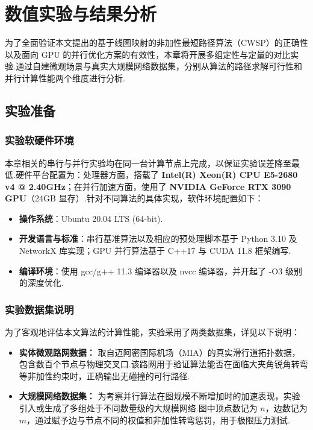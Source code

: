 
\chapter{数值实验与结果分析}

为了全面验证本文提出的基于线图映射的非加性最短路径算法（CWSP）的正确性以及面向 GPU 的并行优化方案的有效性，本章将开展多组定性与定量的对比实验.通过自建微观场景与真实大规模网络数据集，分别从算法的路径求解可行性和并行计算性能两个维度进行分析.

\section{实验准备}

\subsection{实验软硬件环境}
本章相关的串行与并行实验均在同一台计算节点上完成，以保证实验误差降至最低.硬件平台配置为：处理器方面，搭载了 \textbf{Intel(R) Xeon(R) CPU E5-2680 v4 @ 2.40GHz}；在并行加速方面，使用了 \textbf{NVIDIA GeForce RTX 3090 GPU}（24GB 显存）.针对不同算法的具体实现，软件环境配置如下：
\begin{itemize}
    \item \textbf{操作系统}：Ubuntu 20.04 LTS (64-bit).
    \item \textbf{开发语言与标准}：串行基准算法以及相应的预处理脚本基于 Python 3.10 及 NetworkX 库实现；GPU 并行算法基于 C++17 与 CUDA 11.8 框架编写.
    \item \textbf{编译环境}：使用 gcc/g++ 11.3 编译器以及 nvcc 编译器，并开起了 -O3 级别的深度优化.
\end{itemize}

\subsection{实验数据集说明}
为了客观地评估本文算法的计算性能，实验采用了两类数据集，详见以下说明：
\begin{itemize}
    \item \textbf{实体微观路网数据：} 取自迈阿密国际机场（MIA）的真实滑行道拓扑数据，包含数百个节点与物理交叉口.该路网用于验证算法能否在面临大夹角锐角转弯等非加性约束时，正确输出无碰撞的可行路径.
    \item \textbf{大规模网络数据集：} 为考察并行算法在图规模不断增加时的加速表现，实验引入或生成了多组处于不同数量级的大规模网络.图中顶点数记为 $n$，边数记为 $m$，通过赋予边与节点不同的权值和非加性转弯惩罚，用于极限压力测试.
\end{itemize}

